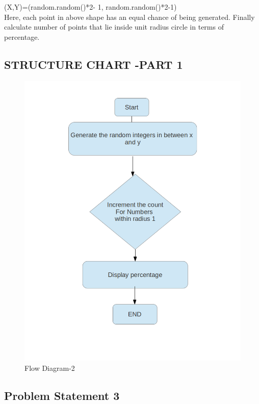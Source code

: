\documentclass[11pt]{article}
\begin{document}
 (X,Y)=(random.random()*2- 1, random.random()*2-1)\\

 Here, each point in above shape has an equal chance of being generated.
Finally calculate number of points that lie inside unit radius circle in terms of percentage.\\
\newpage

\newpage

\begin{center}
\section{STRUCTURE CHART -PART 1}
\end{center}
\bigskip
\begin{figure}[h]
\includegraphics[scale=0.4]{structure1}
\centering
\caption{Flow Diagram-2}
\end{figure}
\newpage
\begin{center}
\section{Problem Statement­ 3}
\end{center}
\end{document}
